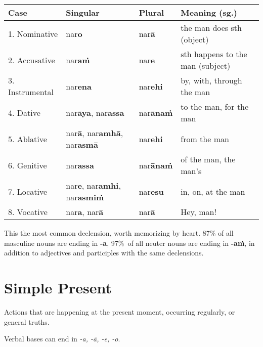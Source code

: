 \documentclass[11pt,oneside]{memoir}
\begin{document}
\begin{center}
\begin{tabular}{llll}
Case & Singular & Plural & Meaning (sg.)\\[0pt]
\hline
1. Nominative & nar\textbf{o} & nar\textbf{ā} & the man does sth (object)\\[0pt]
2. Accusative & nar\textbf{aṁ} & nar\textbf{e} & sth happens to the man (subject)\\[0pt]
3. Instrumental & nar\textbf{ena} & nar\textbf{ehi} & by, with, through the man\\[0pt]
4. Dative & nar\textbf{āya}, nar\textbf{assa} & nar\textbf{ānaṁ} & to the man, for the man\\[0pt]
5. Ablative & nar\textbf{ā}, nar\textbf{amhā}, nar\textbf{asmā} & nar\textbf{ehi} & from the man\\[0pt]
6. Genitive & nar\textbf{assa} & nar\textbf{ānaṁ} & of the man, the man's\\[0pt]
7. Locative & nar\textbf{e}, nar\textbf{amhi}, nar\textbf{asmiṁ} & nar\textbf{esu} & in, on, at the man\\[0pt]
8. Vocative & nar\textbf{a}, nar\textbf{ā} & nar\textbf{ā} & Hey, man!\\[0pt]
\end{tabular}
\end{center}

This the most common declension, worth memorizing by heart. 87\% of all masculine
nouns are ending in \textbf{-a}, \mbox{97\% of} all neuter nouns are ending in \textbf{-aṁ}, in
addition to adjectives and participles with the same declensions.

\clearpage

\section{Simple Present}
\label{sec:org885d52d}

Actions that are happening at the present moment, occurring regularly, or general truths.

Verbal bases can end in \emph{-a, -ā, -e, -o}.
\end{document}
